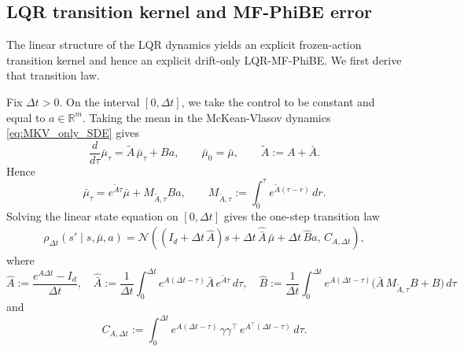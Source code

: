 \documentclass[a4paper, 10pt, english, reqno]{amsart}
\begin{document}
\subsection{LQR transition kernel and MF-PhiBE error}
The linear structure of the LQR dynamics yields an explicit frozen-action
transition kernel and hence an explicit drift-only LQR-MF-PhiBE. We first
derive that transition law.



Fix $\Delta t>0$. On the interval $[0,\Delta t]$, we take the control to be constant and equal to $a\in\mathbb R^m$. Taking the mean in the McKean-Vlasov dynamics \eqref{eq:MKV_only_SDE} gives
\[
    \frac{d}{d\tau}\bar\mu_\tau
    =
    \tilde A\,\bar\mu_\tau+Ba,
    \qquad
    \bar\mu_0=\bar\mu,
    \qquad
    \tilde A:=A+\bar A.
\]
Hence
\[
    \bar\mu_\tau
    =
    e^{\tilde A\tau}\bar\mu
    +
    M_{\tilde A,\tau}Ba,
    \qquad
    M_{\tilde A,\tau}
    :=
    \int_0^\tau e^{\tilde A(\tau-r)}\,dr.
\]
Solving the linear state equation on $[0,\Delta t]$ gives the
one-step transition law
\begin{align}
\label{eq:LQR-phibe-transition-law}    
  \rho_{\Delta t}(s'\mid s,\bar\mu,a)
    =
    \mathcal N\!\left(
        (I_d+\Delta t\,\hat A)s
        +
        \Delta t\,\hat{\bar A}\,\bar\mu
        +
        \Delta t\,\hat B a,\,
        C_{A,\Delta t}
    \right),
\end{align}
where
\begin{equation}
\label{eq:definition_coef_HAT}
    \hat A
    :=
    \frac{e^{A\Delta t}-I_d}{\Delta t},
    \quad
    \hat{\bar A}
    :=
    \frac{1}{\Delta t}
    \int_0^{\Delta t}
    e^{A(\Delta t-\tau)}
    \bar A\,e^{\tilde A\tau}\,d\tau,\quad \hat B
    :=
    \frac{1}{\Delta t}
    \int_0^{\Delta t}
    e^{A(\Delta t-\tau)}
    \bigl(\bar A\,M_{\tilde A,\tau}B+B\bigr)\,d\tau
\end{equation}
and \begin{equation*}C_{A,\Delta t} := \int_0^{\Delta t} e^{A(\Delta t-\tau)}\,\gamma\gamma^\top\,e^{A^\top(\Delta t-\tau)}\,d\tau. 
\end{equation*}
\end{document}
